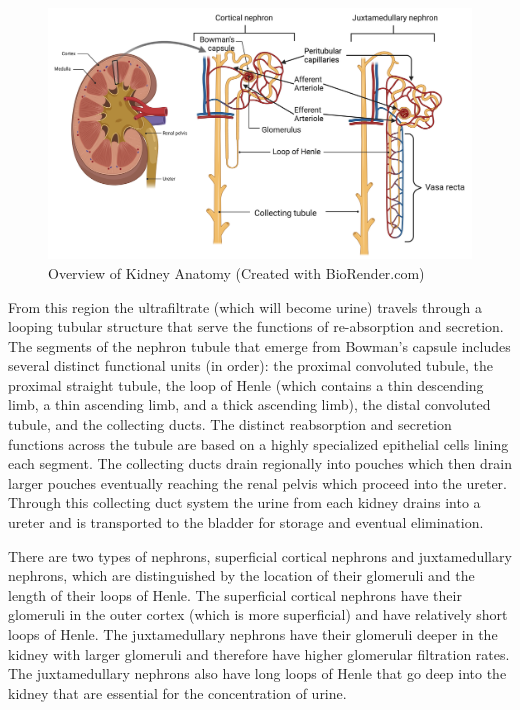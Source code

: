 \begin{figure}[!h]
    \centering
    \includegraphics[width=1.0\linewidth]{./figure/Kidney_Anatomy.png}
    \caption{Overview of Kidney Anatomy \footnotesize{(Created with BioRender.com)}}
    \label{fig:Kidney_Anatomy}
\end{figure}  


From this region the ultrafiltrate (which will become urine) travels through a looping tubular structure that serve the functions of re-absorption and secretion. The segments of the nephron tubule that emerge from Bowman’s capsule includes several distinct functional units (in order): the proximal convoluted tubule, the proximal straight tubule, the loop of Henle (which contains a thin descending limb, a thin ascending limb, and a thick ascending limb), the distal convoluted tubule, and the collecting ducts. The distinct reabsorption and secretion functions across the tubule are based on a highly specialized epithelial cells lining each segment. The collecting ducts drain regionally into pouches which then drain larger pouches eventually reaching the renal pelvis which proceed into the ureter. Through this collecting duct system the urine from each kidney drains into a ureter and is transported to the bladder for storage and eventual elimination.

There are two types of nephrons, superficial cortical nephrons and juxtamedullary nephrons, which are distinguished by the location of their glomeruli and the length of their loops of Henle. The superficial cortical nephrons have their glomeruli in the outer cortex (which is more superficial) and have relatively short loops of Henle. The juxtamedullary nephrons have their glomeruli deeper in the kidney with larger glomeruli and therefore have higher glomerular filtration rates. The juxtamedullary nephrons also have long loops of Henle that go deep into the kidney that are essential for the concentration of urine. 

